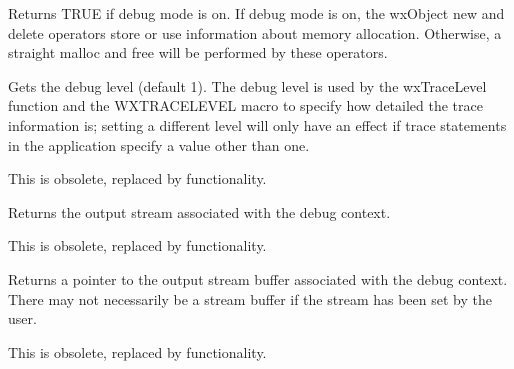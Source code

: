 

\label{wxdebugcontextgetdebugmode}


Returns TRUE if debug mode is on. If debug mode is on, the wxObject new and delete
operators store or use information about memory allocation. Otherwise,
a straight malloc and free will be performed by these operators.



\label{wxdebugcontextgetlevel}


Gets the debug level (default 1). The debug level is used by the wxTraceLevel function and
the WXTRACELEVEL macro to specify how detailed the trace information is; setting
a different level will only have an effect if trace statements in the application
specify a value other than one.

This is obsolete, replaced by  functionality.



\label{wxdebugcontextgetstream}


Returns the output stream associated with the debug context.

This is obsolete, replaced by  functionality.



\label{wxdebugcontextgetstreambuf}


Returns a pointer to the output stream buffer associated with the debug context.
There may not necessarily be a stream buffer if the stream has been set
by the user.

This is obsolete, replaced by  functionality.

